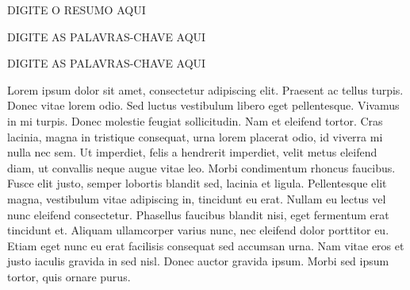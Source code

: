 \documentclass[qual, classic, a4paper]{ufbathesis}
\begin{document}
\resumo
DIGITE O RESUMO AQUI
\begin{keywords}
DIGITE AS PALAVRAS-CHAVE AQUI
\end{keywords}

\abstract
\begin{keywords}
DIGITE AS PALAVRAS-CHAVE AQUI
\end{keywords}

\tableofcontents

\listoffigures

\listoftables

\mainmatter

% 
% 
% 
%


Lorem ipsum dolor sit amet, consectetur adipiscing elit. Praesent ac tellus turpis. Donec vitae lorem odio. Sed luctus vestibulum libero eget pellentesque. Vivamus in mi turpis. Donec molestie feugiat sollicitudin. Nam et eleifend tortor. Cras lacinia, magna in tristique consequat, urna lorem placerat odio, id viverra mi nulla nec sem. Ut imperdiet, felis a hendrerit imperdiet, velit metus eleifend diam, ut convallis neque augue vitae leo. Morbi condimentum rhoncus faucibus. Fusce elit justo, semper lobortis blandit sed, lacinia et ligula. Pellentesque elit magna, vestibulum vitae adipiscing in, tincidunt eu erat. Nullam eu lectus vel nunc eleifend consectetur. Phasellus faucibus blandit nisi, eget fermentum erat tincidunt et. Aliquam ullamcorper varius nunc, nec eleifend dolor porttitor eu. Etiam eget nunc eu erat facilisis consequat sed accumsan urna. Nam vitae eros et justo iaculis gravida in sed nisl. Donec auctor gravida ipsum. Morbi sed ipsum tortor, quis ornare purus.
\end{document}
